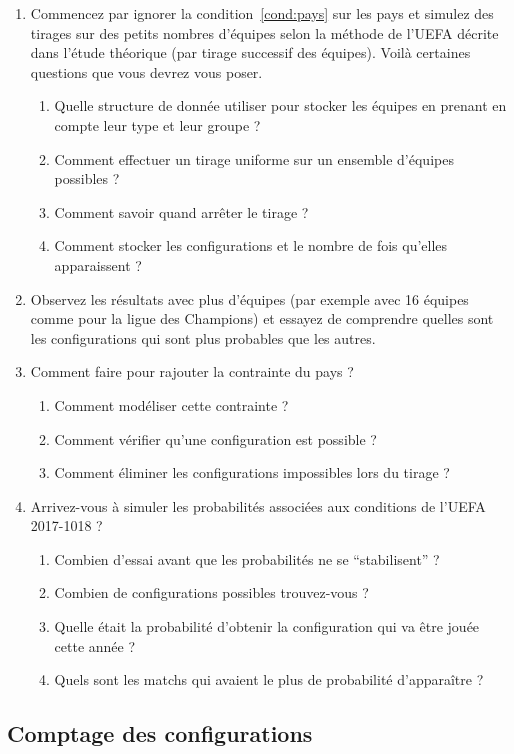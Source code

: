 \documentclass{../ficheTDTP}
\begin{document}
\begin{enumerate}
\item Commencez par ignorer la condition~\ref{cond:pays} sur les pays et simulez des tirages sur des petits nombres d'équipes selon la méthode de l'UEFA décrite dans l'étude théorique (par tirage successif des équipes). Voilà certaines questions que vous devrez vous poser.
\begin{enumerate}
\item Quelle structure de donnée utiliser pour stocker les équipes en prenant en compte leur type et leur groupe ?
\item Comment effectuer un tirage uniforme sur un ensemble d'équipes possibles ?
\item Comment savoir quand arrêter le tirage ?
\item Comment stocker les configurations et le nombre de fois qu'elles apparaissent ?
\end{enumerate}
\item Observez les résultats avec plus d'équipes (par exemple avec 16 équipes comme pour la ligue des Champions) et essayez de comprendre quelles sont les configurations qui sont plus probables que les autres.
\item Comment faire pour rajouter la contrainte du pays ?
\begin{enumerate}
\item Comment modéliser cette contrainte ?
\item Comment vérifier qu'une configuration est possible ?
\item Comment éliminer les configurations impossibles lors du tirage ?
\end{enumerate}
\item Arrivez-vous à simuler les probabilités associées aux conditions de l'UEFA 2017-1018 ?
\begin{enumerate}
\item Combien d'essai avant que les probabilités ne se ``stabilisent'' ?
\item Combien de configurations possibles trouvez-vous ?
\item Quelle était la probabilité d'obtenir la configuration qui va être jouée cette année ?
\item Quels sont les matchs qui avaient le plus de probabilité d’apparaître ?
\end{enumerate}
\end{enumerate}

\subsection{Comptage des configurations}
\end{document}
